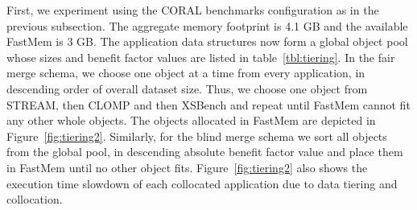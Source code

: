 \vspace{1ex}
\vspace{0.3ex} 

\noindent First, we experiment using the CORAL benchmarks configuration as in the previous subsection. The aggregate memory footprint is 4.1 GB and the available FastMem is 3 GB. The application data structures now form a global object pool whose sizes and benefit factor values are listed in table~\ref{tbl:tiering}. In the fair merge schema, we choose one object at a time from every application, in descending order of overall dataset size. Thus, we choose one object from STREAM, then CLOMP and then XSBench and repeat until FastMem cannot fit any other whole objects. The objects allocated in FastMem are depicted in Figure~\ref{fig:tiering2}. Similarly, for the blind merge schema we sort all objects from the global pool, in descending absolute benefit factor value and place them in FastMem until no other object fits. 
Figure~\ref{fig:tiering2} also shows the execution time slowdown of each collocated application due to data tiering and collocation.

